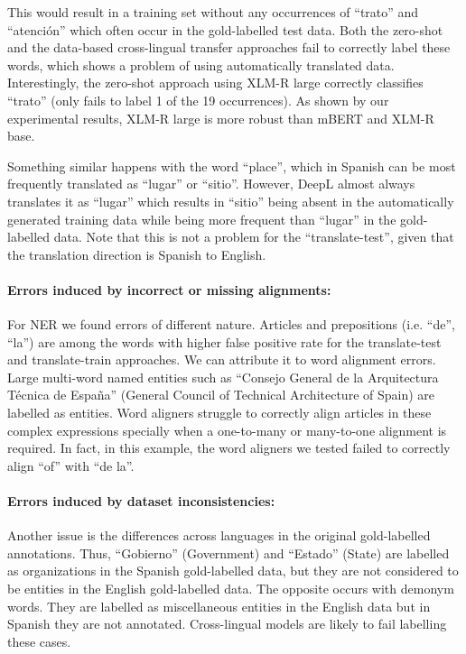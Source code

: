 \documentclass[11pt]{article}
\begin{document}
This would result in a training set without any occurrences of ``trato'' and ``atención'' which often occur in the gold-labelled test data. Both the zero-shot and the data-based cross-lingual transfer approaches fail to correctly label these words, which shows a problem of using automatically translated data. Interestingly, the zero-shot approach using XLM-R large correctly classifies ``trato'' (only fails to label 1 of the 19 occurrences). As shown by our experimental results, XLM-R large is more robust than mBERT and XLM-R base.

Something similar happens with the word ``place'', which in Spanish can be most frequently translated as ``lugar''  or ``sitio''. However, DeepL almost always translates it as ``lugar'' which results in ``sitio'' being absent in the automatically generated training data while being more frequent than ``lugar'' in the gold-labelled data. Note that this is not a problem for the ``translate-test'', given that the translation direction is Spanish to English.

\paragraph{Errors induced by incorrect or missing alignments:} For NER we found errors of different nature. Articles and prepositions (i.e. ``de'', ``la'') are among the words with higher false positive rate for the translate-test and translate-train approaches. We can attribute it to word alignment errors. Large multi-word named entities such as ``Consejo General de la Arquitectura Técnica de España'' (General Council of Technical Architecture of Spain) are labelled as entities. Word aligners struggle to correctly align articles in these complex expressions specially when a one-to-many or many-to-one alignment is required. In fact, in this example, the word aligners we tested failed to correctly align ``of'' with ``de la''.

\paragraph{Errors induced by dataset inconsistencies:} Another issue is the differences across languages in the original gold-labelled annotations. Thus, ``Gobierno'' (Government) and ``Estado'' (State) are labelled as organizations in the Spanish gold-labelled data, but they are not considered to be entities in the English gold-labelled data. The opposite occurs with demonym words. They are labelled as miscellaneous entities in the English data but in Spanish they are not annotated. Cross-lingual models are likely to fail labelling these cases.
\end{document}
